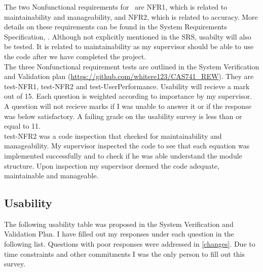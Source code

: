\documentclass[12pt, titlepage]{article}
\begin{document}
The two Nonfunctional requirements for \progname \ are NFR1, which is related 
to maintainability and manageability, and NFR2, which is related to accuracy. 
More details on these requirements can be found in the System 
Requirements Specification, \cite{SRS}. Although not explicitly mentioned in 
the SRS, usabilty will also be tested. It is related to maintainability as my 
supervisor should be able to use the code after we have completed the project.\\
The three Nonfunctional requirement tests are outlined in the System 
Verification and Validation plan 
(\url{https://github.com/whitere123/CAS741_REW}). They are test-NFR1, test-NFR2 
and test-UserPerformance. Usability will recieve a mark out of 15. Each 
question is weighted according to importance by my supervisor. A question will 
not recieve marks if I was unable to answer 
it or if the response was below satisfactory. A failing grade on the usability 
survey is less than or equal to 11. \\
test-NFR2 was a code inspection that checked for maintainability and 
manageability. My supervisor inspected the code to see that each equation was 
implemented successfully and to check if he was able understand the module 
structure. Upon inspection my supervisor deemed the code adequate, maintainable 
and manageable. 

\subsection{Usability} 

The following usability table was proposed in the System Verification and 
Validation Plan. I have filled out my responses under each question in the 
following list. Questions 
with poor responses were addressed in \ref{changes}. Due to time constraints 
and other commitments I was the only person to fill out this survey.
\end{document}
